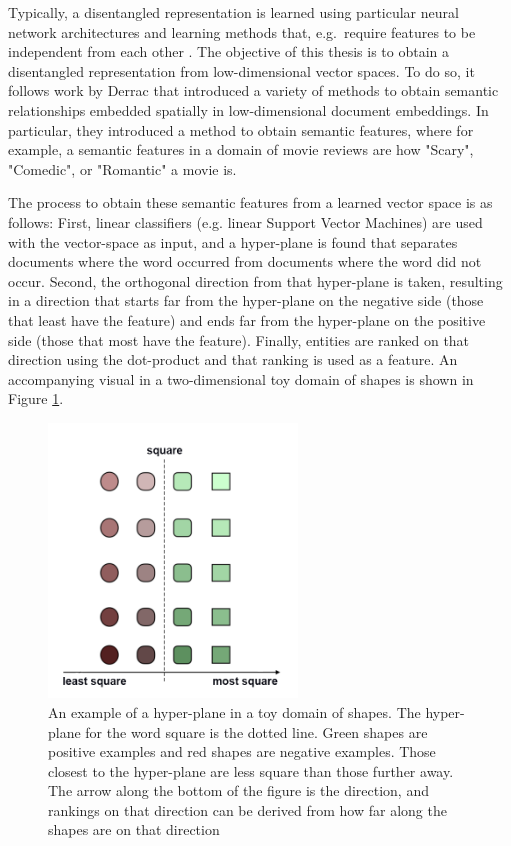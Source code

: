 Typically, a disentangled representation is learned  using particular  neural network architectures and learning methods that, e.g.\ require  features to be independent from each other \cite{Banner}  \cite{Paige2016}. The objective of this thesis is to obtain a disentangled representation from low-dimensional vector spaces. To do so, it follows work by Derrac \cite{Derrac2015} that introduced a variety of methods to obtain semantic relationships embedded spatially in  low-dimensional document embeddings. In particular, they introduced a method to obtain semantic features, where for example, a semantic features in a domain of movie reviews are how "Scary", "Comedic", or "Romantic" a movie is. 

The process to obtain these semantic features  from a learned vector space is as follows: First, linear classifiers (e.g. linear Support Vector Machines) are used with the vector-space as input, and a hyper-plane is found that separates documents where the word occurred from documents where the word did not occur. Second, the orthogonal direction from that hyper-plane is taken, resulting in a direction that starts  far from the hyper-plane on the negative side (those that least have the feature) and ends far from the hyper-plane on the positive side (those that most have the feature).  Finally, entities are ranked on that direction using the dot-product and that ranking is used as a feature. An accompanying visual in a two-dimensional toy domain of shapes is shown in Figure \ref{ch1:introhyp}.  %

\begin{figure}[t]
	\includegraphics[width=250px]{images/Toyhyperplane1Direction.png}
	\centering
	\caption{An example of a hyper-plane in a toy domain of shapes. The hyper-plane for the word square is the dotted line. Green shapes are positive examples and red shapes are negative examples. Those closest to the hyper-plane are less square than those further away. The arrow along the bottom of the figure is the direction, and rankings on that direction can be derived from how far along the shapes are on that direction}\label{ch1:introhyp}
\end{figure}

